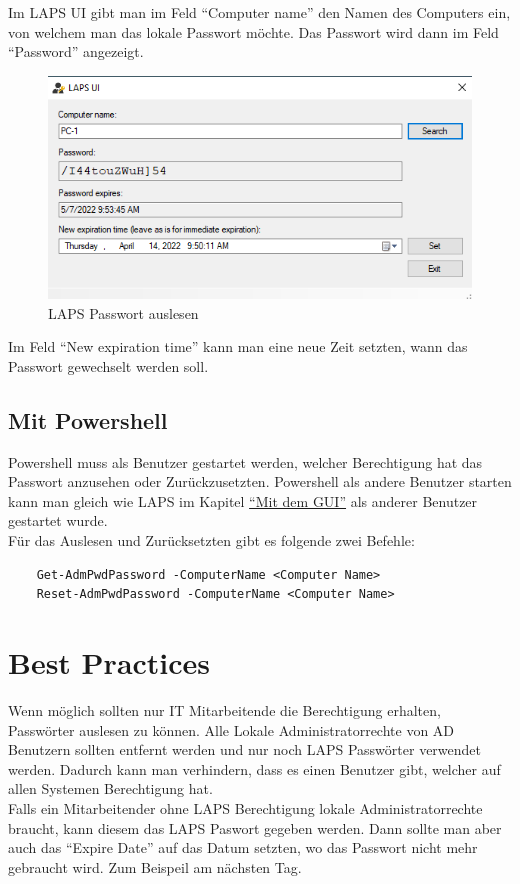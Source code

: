 Im LAPS UI gibt man im Feld ``Computer name'' den Namen des Computers ein, von welchem man das lokale Passwort möchte.
Das Passwort wird dann im Feld ``Password'' angezeigt.
\begin{figure}[H]
    \centering
    \includegraphics[width=0.7\linewidth]{../img/LAPS/Laps-ui.png}
    \caption{LAPS Passwort auslesen}
\end{figure}
Im Feld ``New expiration time'' kann man eine neue Zeit setzten, wann das Passwort gewechselt werden soll.

\subsection{Mit Powershell}
Powershell muss als Benutzer gestartet werden, welcher Berechtigung hat das Passwort anzusehen oder Zurückzusetzten.
Powershell als andere Benutzer starten kann man gleich wie LAPS im Kapitel \hyperref[subsec:laps-gui-usage]{``Mit dem GUI''} als anderer Benutzer gestartet wurde.\\

Für das Auslesen und Zurücksetzten gibt es folgende zwei Befehle:
\begin{lstlisting}
    Get-AdmPwdPassword -ComputerName <Computer Name>
    Reset-AdmPwdPassword -ComputerName <Computer Name>
\end{lstlisting}


\section{Best Practices}
Wenn möglich sollten nur IT Mitarbeitende die Berechtigung erhalten, Passwörter auslesen zu können.
Alle Lokale Administratorrechte von AD Benutzern sollten entfernt werden und nur noch LAPS Passwörter verwendet werden.
Dadurch kann man verhindern, dass es einen Benutzer gibt, welcher auf allen Systemen Berechtigung hat.\\

Falls ein Mitarbeitender ohne LAPS Berechtigung lokale Administratorrechte braucht, kann diesem das LAPS Paswort gegeben werden.
Dann sollte man aber auch das ``Expire Date'' auf das Datum setzten, wo das Passwort nicht mehr gebraucht wird.
Zum Beispeil am nächsten Tag.

